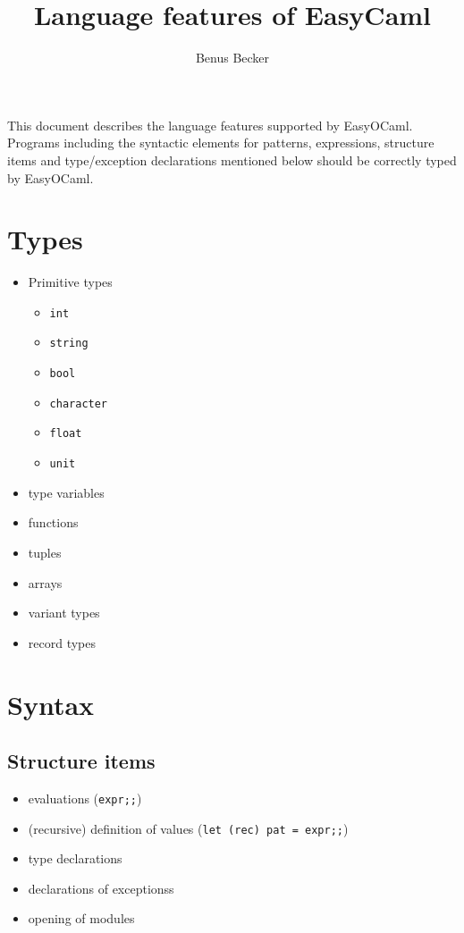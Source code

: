 \documentclass{article}
\title{Language features of EasyCaml}
\author{Benus Becker}
\begin{document}
\maketitle

This document describes the language features supported by EasyOCaml. Programs
including the syntactic elements for patterns, expressions, structure items and
type/exception declarations mentioned below should be correctly typed by
EasyOCaml.

\section{Types}

\begin{multicols}{2}
\begin{itemize}
  \item Primitive types
	\begin{itemize}
	  \item \texttt{int}
	  \item \texttt{string}
	  \item \texttt{bool}
	  \item \texttt{character}
	  \item \texttt{float}
	  \item \texttt{unit}
	\end{itemize}
  \item type variables
  \item functions 
  \item tuples
  \item arrays
  \item variant types
  \item record types
\end{itemize}
\end{multicols}

\section{Syntax}

\subsection{Structure items}

\begin{multicols}{2}
\begin{itemize}
  \item evaluations (\texttt{expr;;})
  \item (recursive) definition of values (\texttt{let (rec) pat = expr;;})
  \item type declarations
  \item declarations of exceptionss
  \item opening of modules
\end{itemize}
\end{multicols}
\end{document}
